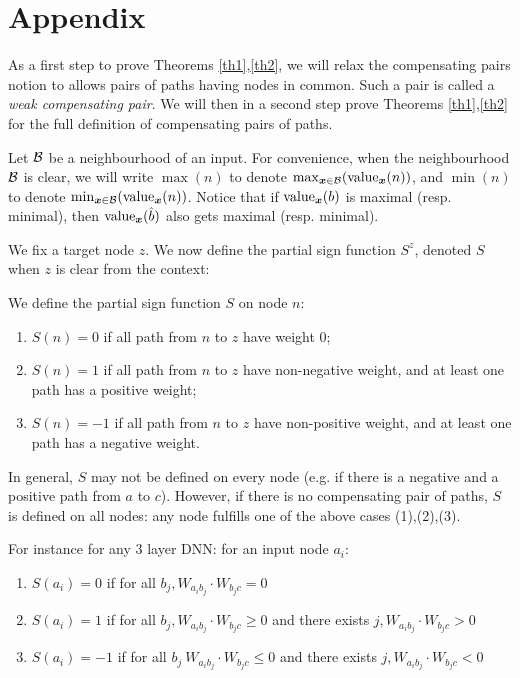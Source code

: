 \section*{Appendix}
As a first step to prove Theorems \ref{th1},\ref{th2}, 
we will relax the compensating pairs notion to allows pairs of paths having nodes in common.
Such a pair is called a {\em weak compensating pair}.
We will then in a second step prove Theorems \ref{th1},\ref{th2} for the full definition of compensating pairs of paths.

Let $\cal B$ be a neighbourhood of an input.
For convenience,
when the neighbourhood $\cal B$ is clear, 
we will write $\max(n)$ to denote $\max_{\boldsymbol{x} \in \cal B}({\textrm{value}}_{\boldsymbol{x}}(n))$, and $\min(n)$ to denote $\min_{\boldsymbol{x} \in \cal B}({\textrm{value}}_{\boldsymbol{x}}(n))$.
Notice that if ${\textrm{value}}_{\boldsymbol{x}}(b)$ is maximal (resp. minimal), 
then ${\textrm{value}}_{\boldsymbol{x}}(\hat{b})$ also gets maximal (resp. minimal). 


We fix a target node $z$.
We now define the partial sign function $S^z$, denoted $S$ when $z$ is clear from the context:

\begin{definition}
	\label{sign_of_nodes}
	We define the partial sign function $S$ on node $n$: 	
	\begin{enumerate}
		\item $S(n)=0$ if all path from $n$ to $z$ have weight $0$; 
		\item $S(n)=1$ if all path from $n$ to $z$ have non-negative weight, and at least one path has a positive weight; 
		\item $S(n)=-1$ if all path from $n$ to $z$ have non-positive weight, and at least one path has a negative weight. 
	\end{enumerate}
\end{definition}

In general, $S$ may not be defined on every node 
(e.g. if there is a negative and a positive path from $a$ to $c$). 
However, if there is no compensating pair of paths, 
$S$ is defined on all nodes: any node fulfills one of the above cases (1),(2),(3).

For instance for any 3 layer DNN: for an input node $a_i$:
\begin{enumerate}
	\item  $S(a_i)=0$ if 
	for all $b_j, W_{a_i b_j}\cdot W_{b_j c} = 0$
	
	
	\item  $S(a_i)=1$ if for all $b_j, W_{a_i b_j}\cdot W_{b_j c} \geq 0$ and there exists 
	$j, W_{a_i b_j}\cdot W_{b_j c} > 0$
	
	\item $S(a_i)=-1$ if for all $b_j\ W_{a_i b_j}\cdot W_{b_j c} \leq 0$ and there exists 
	$j, W_{a_i b_j}\cdot W_{b_j c} < 0$ 
\end{enumerate}

